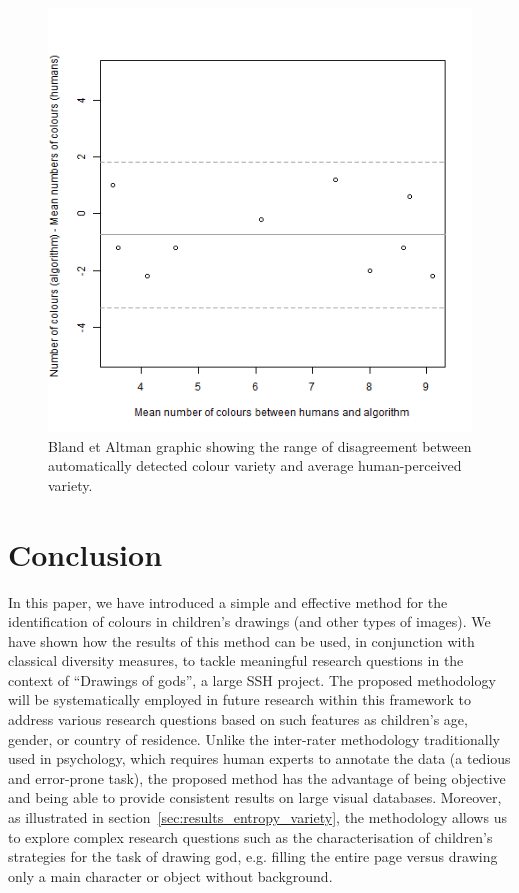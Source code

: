 \documentclass[11pt,a4paper]{article}
\begin{document}
\begin{figure}[h!]
	\centering
	\includegraphics[width=\linewidth]{figures/comp_nb_colours_agreement.png}
	\caption{Bland et Altman graphic showing the range of disagreement between automatically detected colour variety and average human-perceived variety.}
	\label{fig:blandandaltman}
\end{figure}

\section{Conclusion}
\label{sec:conclusion}
In this paper, we have introduced a simple and effective method for the identification of colours in children's drawings (and other types of images). We have shown how the results of this method can be used, in conjunction with classical diversity measures, to tackle meaningful research questions in the context of ``Drawings of gods'', a large SSH project. The proposed methodology will be systematically employed in future research within this framework to address various research questions based on such features as children's age, gender, or country of residence. Unlike the inter-rater methodology traditionally used in psychology, which requires human experts to annotate the data (a tedious and error-prone task), the proposed method has the advantage of being objective and being able to provide consistent results on large visual databases. Moreover, as illustrated in section~\ref{sec:results_entropy_variety}, the methodology allows us to explore complex research questions such as the characterisation of children's strategies for the task of drawing god, e.g. filling the entire page versus drawing only a main character or object without background.
\end{document}
